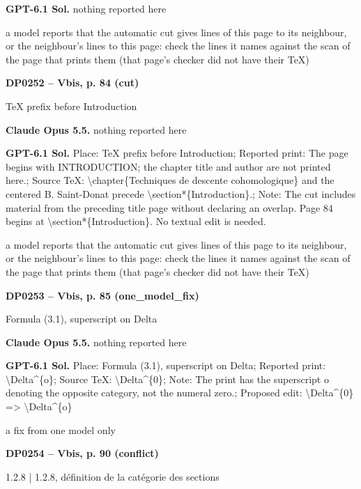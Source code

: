 \textbf{GPT-6.1 Sol.} nothing reported here\par
a model reports that the automatic cut gives lines of this page to its neighbour, or the neighbour's lines to this page: check the lines it names against the scan of the page that prints them (that page's checker did not have their TeX)\par
\par\noindent\hypertarget{DP0252}{}\textbf{DP0252 -- Vbis, p. 84 (cut)}\par
TeX prefix before Introduction\par
\textbf{Claude Opus 5.5.} nothing reported here\par
\textbf{GPT-6.1 Sol.} Place: TeX prefix before Introduction; Reported print: The page begins with INTRODUCTION; the chapter title and author are not printed here.; Source TeX: \textbackslash{}chapter\{Techniques de descente cohomologique\} and the centered B. Saint-Donat precede \textbackslash{}section*\{Introduction\}.; Note: The cut includes material from the preceding title page without declaring an overlap. Page 84 begins at \textbackslash{}section*\{Introduction\}. No textual edit is needed.\par
a model reports that the automatic cut gives lines of this page to its neighbour, or the neighbour's lines to this page: check the lines it names against the scan of the page that prints them (that page's checker did not have their TeX)\par
\par\noindent\hypertarget{DP0253}{}\textbf{DP0253 -- Vbis, p. 85 (one\_model\_fix)}\par
Formula (3.1), superscript on Delta\par
\textbf{Claude Opus 5.5.} nothing reported here\par
\textbf{GPT-6.1 Sol.} Place: Formula (3.1), superscript on Delta; Reported print: \textbackslash{}Delta\textasciicircum{}\{o\}; Source TeX: \textbackslash{}Delta\textasciicircum{}\{0\}; Note: The print has the superscript o denoting the opposite category, not the numeral zero.; Proposed edit: \textbackslash{}Delta\textasciicircum{}\{0\} =\allowbreak > \textbackslash{}Delta\textasciicircum{}\{o\}\par
a fix from one model only\par
\par\noindent\hypertarget{DP0254}{}\textbf{DP0254 -- Vbis, p. 90 (conflict)}\par
1.2.8 | 1.2.8, définition de la catégorie des sections\par
